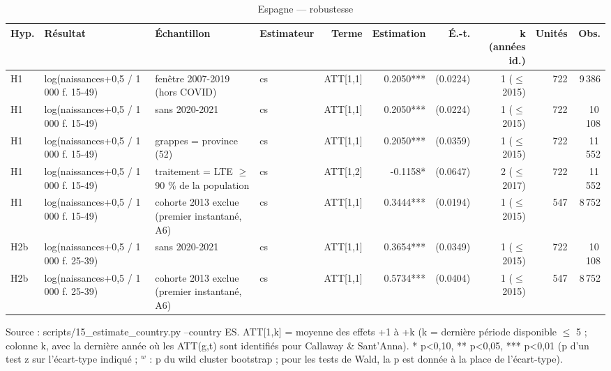 \begin{table}\centering
\begin{threeparttable}
\caption{Espagne — robustesse}\label{tab:es_robust}
\scriptsize
\begin{tabular}{lp{6.1cm}p{6.7cm}lrrrrrr}
\toprule
Hyp. & Résultat & Échantillon & Estimateur & Terme & Estimation & É.-t. & k (années id.) & Unités & Obs. \\
\midrule
H1 & log(naissances+0,5 / 1 000 f. 15-49) & fenêtre 2007-2019 (hors COVID) & cs & ATT[1,1] & 0.2050*** & (0.0224) & 1 ($\leq$ 2015) & 722 & 9\,386 \\
H1 & log(naissances+0,5 / 1 000 f. 15-49) & sans 2020-2021 & cs & ATT[1,1] & 0.2050*** & (0.0224) & 1 ($\leq$ 2015) & 722 & 10\,108 \\
H1 & log(naissances+0,5 / 1 000 f. 15-49) & grappes = province (52) & cs & ATT[1,1] & 0.2050*** & (0.0359) & 1 ($\leq$ 2015) & 722 & 11\,552 \\
H1 & log(naissances+0,5 / 1 000 f. 15-49) & traitement = LTE $\geq$ 90 \% de la population & cs & ATT[1,2] & -0.1158* & (0.0647) & 2 ($\leq$ 2017) & 722 & 11\,552 \\
H1 & log(naissances+0,5 / 1 000 f. 15-49) & cohorte 2013 exclue (premier instantané, A6) & cs & ATT[1,1] & 0.3444*** & (0.0194) & 1 ($\leq$ 2015) & 547 & 8\,752 \\
H2b & log(naissances+0,5 / 1 000 f. 25-39) & sans 2020-2021 & cs & ATT[1,1] & 0.3654*** & (0.0349) & 1 ($\leq$ 2015) & 722 & 10\,108 \\
H2b & log(naissances+0,5 / 1 000 f. 25-39) & cohorte 2013 exclue (premier instantané, A6) & cs & ATT[1,1] & 0.5734*** & (0.0404) & 1 ($\leq$ 2015) & 547 & 8\,752 \\
\bottomrule
\end{tabular}
\begin{tablenotes}\footnotesize
\item Source : scripts/15\_estimate\_country.py --country ES. ATT[1,k] = moyenne des effets +1 à +k (k = dernière période disponible $\leq$ 5 ; colonne k, avec la dernière année où les ATT(g,t) sont identifiés pour Callaway \& Sant'Anna). * p<0,10, ** p<0,05, *** p<0,01 (p d'un test z sur l'écart-type indiqué ; $^{w}$ : p du wild cluster bootstrap ; pour les tests de Wald, la p est donnée à la place de l'écart-type).
\end{tablenotes}
\end{threeparttable}
\end{table}
